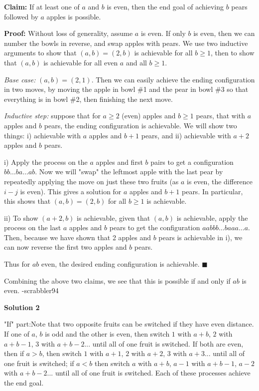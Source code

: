 \begin{enumerate}
 \textbf{Claim:} If at least one of $a$ and $b$ is even, then the end goal of achieving $b$ pears followed by $a$ apples is possible.

 \textbf{Proof:} Without loss of generality, assume $a$ is even. If only $b$ is even, then we can number the bowls in reverse, and swap apples with pears. We use two inductive arguments to show that $(a,b) = (2,b)$ is achievable for all $b\ge 1$, then to show that $(a,b)$ is achievable for all even $a$ and all $b\ge 1$.

 \textit{Base case:} $(a,b) = (2,1)$. Then we can easily achieve the ending configuration in two moves, by moving the apple in bowl \#1 and the pear in bowl \#3 so that everything is in bowl \#2, then finishing the next move.

 \textit{Inductive step:} suppose that for $a \ge 2$ (even) apples and $b \ge 1$ pears, that with $a$ apples and $b$ pears, the ending configuration is achievable. We will show two things: i) achievable with $a$ apples and $b+1$ pears, and ii) achievable with $a+2$ apples and $b$ pears.

 i) Apply the process on the $a$ apples and first $b$ pairs to get a configuration $bb\ldots ba\ldots ab$. Now we will "swap" the leftmost apple with the last pear by repeatedly applying the move on just these two fruits (as $a$ is even, the difference $i-j$ is even). This gives a solution for $a$ apples and $b+1$ pears. In particular, this shows that $(a,b) = (2,b)$ for all $b\ge 1$ is achievable.

 ii) To show $(a+2, b)$ is achievable, given that $(a,b)$ is achievable, apply the process on the last $a$ apples and $b$ pears to get the configuration $aabbb\ldots baaa\ldots a$. Then, because we have shown that 2 apples and $b$ pears is achievable in i), we can now reverse the first two apples and $b$ pears.

 Thus for $ab$ even, the desired ending configuration is achievable. $\blacksquare$

 Combining the above two claims, we see that this is possible if and only if $ab$ is even. -scrabbler94

 



\textbf{Solution 2}

"If" part:Note that two opposite fruits can be switched if they have even distance. If one of $a$, $b$ is odd and the other is even, then switch $1$ with $a+b$, $2$ with $a+b-1$, $3$ with $a+b-2$... until all of one fruit is switched. If both are even, then if $a>b$, then switch $1$ with $a+1$, $2$ with $a+2$, $3$ with $a+3$... until all of one fruit is switched; if $a<b$ then switch $a$ with $a+b$, $a-1$ with $a+b-1$, $a-2$ with $a+b-2$... until all of one fruit is switched. Each of these processes achieve the end goal.


\end{enumerate}
